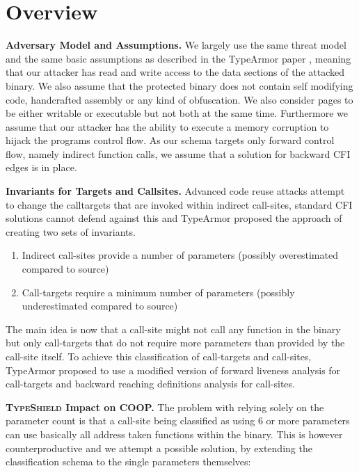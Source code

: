 \section{Overview}
\label{chapter:TypeShild Overview}

\textbf{Adversary Model and Assumptions.}
\label{Adversary Model}
We largely use the same threat model and the same basic assumptions as described in the TypeArmor 
paper \cite{veen:typearmor}, meaning that our attacker has read and write access to the data 
sections of the attacked binary.  We also assume that the protected binary does not contain 
self modifying code, handcrafted assembly or any kind of obfuscation. We also consider pages 
to be either writable or executable but not both at the same time. Furthermore we assume 
that our attacker has the ability to execute a memory corruption to hijack the programs 
control flow. As our schema targets only forward control flow, namely indirect function 
calls, we assume that a solution for backward CFI edges is in place.

\textbf{Invariants for Targets and Callsites.}
\label{Invariants for Targets and Callsites}
Advanced code reuse attacks attempt to change the calltargets that are invoked within indirect 
call-sites, standard CFI solutions cannot defend against this and TypeArmor proposed the approach
of creating two sets of invariants. 

\begin{enumerate}
\item Indirect call-sites provide a number of parameters (possibly overestimated compared to source)
\item Call-targets require a minimum number of parameters (possibly underestimated compared to source)
\end{enumerate}

The main idea is now that a call-site might not call any function in the binary but only call-targets
that do not require more parameters than provided by the call-site itself. To achieve this classification
of call-targets and call-sites, TypeArmor proposed to use a modified version of forward liveness analysis
for call-targets and backward reaching definitions analysis for call-sites.


\textbf{\textsc{TypeShield} Impact on COOP.}
\label{TypeShild Impact on COOP}
The problem with relying solely on the parameter count is that a call-site being classified as using
6 or more parameters can use basically all address taken functions within the binary. This is however
counterproductive and we attempt a possible solution, by extending the classification schema to the
single parameters themselves:

